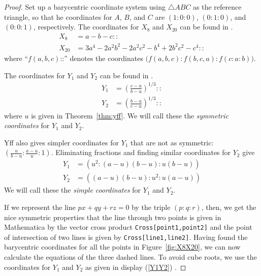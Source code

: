 \documentclass[12pt,a4paper]{amsart}
\begin{document}
\begin{proof}
Set up a barycentric coordinate system using $\triangle ABC$ as the reference triangle,
so that he coordinates for $A$, $B$, and $C$ are $(1:0:0)$, $(0:1:0)$, and $(0:0:1)$, respectively.
The coordinates for $X_8$ and $X_{20}$ can be found in \cite{ETC}.
\begin{align*}
X_8&=a - b - c::\\
X_{20}&=3 a^4-2 a^2 b^2-2 a^2 c^2-b^4+2 b^2 c^2-c^4::
\end{align*}
where ``$f(a,b,c)$::'' denotes the coordinates $\bigl(f(a,b,c):f(b,c,a):f(c:a:b)\bigr)$.

The coordinates for $Y_1$ and $Y_2$ can be found in \cite{Yff}.
\begin{align*}
Y_1&=\left(\frac{c-u}{b-u}\right)^{1/3}::\\
Y_2&=\left(\frac{b-u}{c-u}\right)^{1/3}::
\end{align*}
where $u$ is given in Theorem~\ref{thm:yff}.
We will call these the \emph{symmetric coordinates} for $Y_1$ and $Y_2$.

Yff also gives simpler coordinates for $Y_1$ that are not as symmetric: $\left(\frac{u}{b-u}:\frac{a-u}{u}:1\right)$.
Eliminating fractions and finding similar coordinates for $Y_2$ give
\begin{equation}
\label{Y1Y2}
\begin{aligned}
Y_1&=\left(u^2:(a-u)(b-u):u(b-u)\right)\\
Y_2&=\left((a-u)(b-u):u^2:u(a-u)\right)
\end{aligned}
\end{equation}
We will call these the \emph{simple coordinates} for $Y_1$ and $Y_2$.

If we represent the line $px+qy+rz=0$ by the triple $(p:q:r)$,
then, we get the nice symmetric properties that the line through two points is
given in Mathematica by the vector cross product \texttt{Cross[point1,point2]} and
the point of intersection of two lines is given by \texttt{Cross[line1,line2]}.
Having found the barycentric coordinates for all the points in Figure~\ref{fig:X8X20},
we can now calculate the equations of the three dashed lines.
To avoid cube roots, we use the coordinates for $Y_1$ and $Y_2$ as given in display (\ref{Y1Y2}) .


\end{proof}
\end{document}
